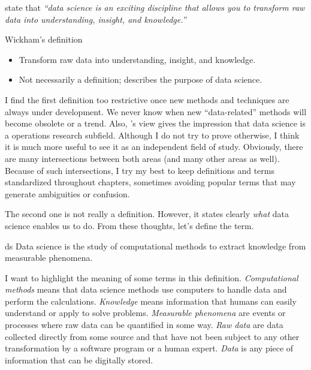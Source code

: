 \textcite{Wickham2023} state that \emph{``data science is an exciting discipline that
allows you to transform raw data into understanding, insight, and knowledge.''}

\begin{slidebox}{Wickham's definition}{}
  \begin{itemize}
    \item Transform raw data into understanding, insight, and knowledge.
    \item Not necessarily a definition; describes the purpose of data science.
  \end{itemize}
\end{slidebox}

I find the first definition too restrictive once new methods and techniques are always
under development.  We never know when new ``data-related'' methods will become obsolete
or a trend.  Also, \citeauthor{Zumel2019}'s view gives the impression that data science is a
operations research subfield.  Although I do not try to prove otherwise, I think it
is much more useful to see it as an independent field of study.  Obviously, there are
many intersections between both areas (and many other areas as well).  Because of such
intersections, I try my best to keep definitions and
terms standardized throughout chapters, sometimes avoiding popular terms that may generate
ambiguities or confusion.

The second one is not really a definition.  However, it states clearly \emph{what} data
science enables us to do.  From these thoughts, let's define the term.

\begin{defbox}{}{ds}
  Data science is the study of computational methods to extract knowledge from
  measurable phenomena.
\end{defbox}

I want to highlight the meaning of some terms in this definition.  \emph{Computational methods} means
that data science methods use computers to handle data and perform the calculations.
\emph{Knowledge} means information that humans can easily understand or apply to solve
problems.  \emph{Measurable phenomena} are events or processes where raw data can be
quantified in some way.  \emph{Raw data} are data collected directly from some source and
that have not been subject to any other transformation by a software program or a human
expert.  \emph{Data} is any piece of information that can be digitally stored.

